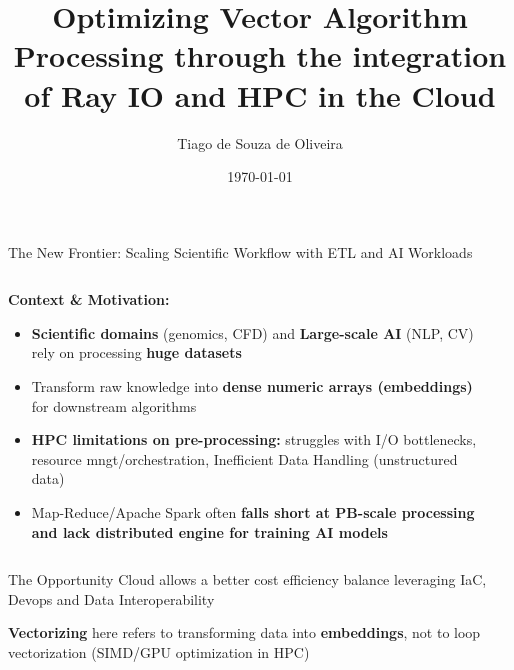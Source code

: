 \documentclass[aspectratio=169]{beamer}
\title[Optimizing Vector Algorithm Processing]{Optimizing Vector Algorithm Processing through the integration of Ray IO and HPC in the Cloud}
\author{Tiago de Souza de Oliveira}
\institute[University]{
    Master's Thesis Defense \\
    Computer Science Department
}
\date{\today}
\begin{document}
\frame{\titlepage}

\begin{frame}{The New Frontier: Scaling Scientific Workflow with ETL and AI Workloads}
    \begin{columns}
        \begin{column}{0.8\textwidth}
            \textbf{Context \& Motivation:}
            \begin{itemize}
                \item \textbf{Scientific domains} (genomics, CFD) and \textbf{Large-scale AI} (NLP, CV) rely on processing \textbf{huge datasets}
                \item Transform raw knowledge into \textcolor{rayblue}{\textbf{dense numeric arrays (embeddings)}} for downstream algorithms
                \item \textbf{HPC limitations on pre-processing:} struggles with I/O bottlenecks, resource mngt/orchestration, Inefficient Data Handling (unstructured data)
                \item Map-Reduce/Apache Spark often \textbf{falls short at PB-scale processing and lack distributed engine for training AI models}
            \end{itemize}
        \end{column}
        \begin{column}{0.2\textwidth}
        \end{column}
    \end{columns}
    
    \vspace{0.3cm}
    \begin{block}{The Opportunity}
        Cloud allows a better cost efficiency balance leveraging IaC, Devops and Data Interoperability
        
        \textbf{Vectorizing} here refers to transforming data into \textbf{embeddings}, not to loop vectorization (SIMD/GPU optimization in HPC)
    \end{block}
\end{frame}
\end{document}
